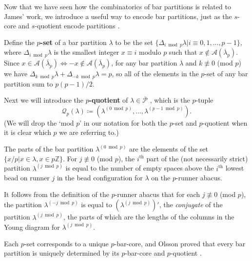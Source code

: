 \documentclass[ALCO, Unicode,published]{cedram}
\newcommand*\nicefrac[2]{#1/#2}
\begin{document}
Now that we have seen how the combinatorics of bar partitions is related to James' work, we introduce a useful way to encode bar partitions, just as the $s$-core and $s$-quotient encode partitions \cite{JK}.

Define the $p$\textbf{-set} \cite{F3} of a bar partition $\lambda$ to be the set $\{\Delta_{i\bmod p}\lambda|i\equiv0,1,\dots,p-1\}$, where $\Delta_{i\bmod p}\lambda$ is the smallest integer $x\equiv i$ modulo $p$ such that $x\not\in\mathcal{A}(\overline{\lambda}_p)$. 
Since $x\in\mathcal{A}(\overline{\lambda}_p)\Leftrightarrow-x\not\in\mathcal{A}(\overline{\lambda}_p)$, for any bar partition $\lambda$ and $k\not\equiv0$ (mod $p$) we have $\Delta_{k\bmod p}\lambda+\Delta_{-k\bmod p}\lambda=p$, so all of the elements in the $p$-set of any bar partition sum to $\nicefrac{p(p-1)}{2}$. 

Next we will introduce the $p$\textbf{-quotient} of $\lambda\in\overline{\mathcal{P}}$ \cite{O1}, which is the $p$-tuple 
$$\mathcal{Q}_p(\lambda)\coloneqq(\lambda^{(0\bmod p)},\dots,\lambda^{(p-1\bmod p)}).$$  
(We will drop the `mod $p$' in our notation for both the $p$-set and $p$-quotient when it is clear which $p$ we are referring to.) 

The parts of the bar partition $\lambda^{(0\bmod p)}$ are the elements of the set $\{\nicefrac{x}{p}|x\in\lambda,x\in p\mathbb{Z}\}$. 
\newline
For $j\not\equiv0$ (mod $p$), the $i^\text{th}$ part of the (not necessarily strict) partition $\lambda^{(j\bmod p)}$ is equal to the number of empty spaces above the $i^\text{th}$ lowest bead on runner $j$ in the bead configuration for $\lambda$ on the $p$-runner abacus. 

It follows from the definition of the $p$-runner abacus that for each $j\not\equiv0$ (mod $p$), the partition $\lambda^{(-j\bmod p)}$ is equal to $(\lambda^{(j\bmod p)})'$, the \textit{conjugate} of the partition $\lambda^{(j\bmod p)}$, the parts of which are the lengths of the columns in the Young diagram for $\lambda^{(j\bmod p)}$. 

Each $p$-set corresponds to a unique $p$-bar-core, and Olsson proved that every bar partition is uniquely determined by its $p$-bar-core and $p$-quotient \cite[Proposition 2.2]{O1}. 
\end{document}
